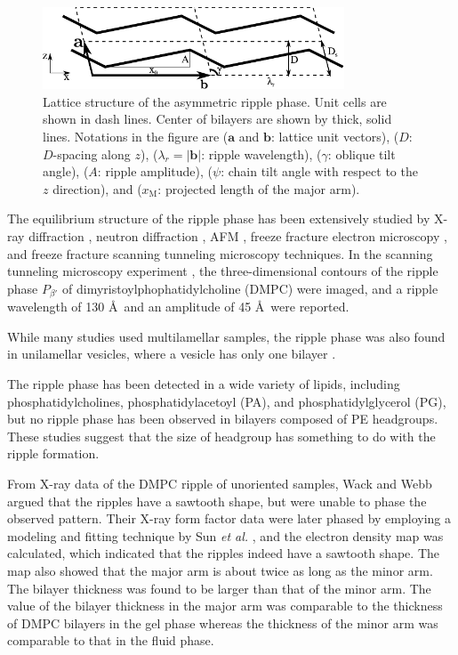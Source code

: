 \begin{figure}[htbp]
  \centering
  \includegraphics[width=0.8\textwidth]{figures/ripple/unit_cell}
  \caption{Lattice structure of the asymmetric ripple phase. Unit cells are shown in
  dash lines. Center of bilayers are shown by thick, solid lines. Notations 
  in the figure are ($\mathbf{a}$ and $\mathbf{b}$: lattice unit vectors),
  ($D$: $D$-spacing along $z$), ($\lambda_r=|\mathbf{b}|$: ripple wavelength), 
  ($\gamma$: oblique tilt angle), ($A$: ripple amplitude),
  ($\psi$: chain tilt angle with respect to the $z$ direction),
  and ($x_\textrm{M}$: projected length of the major arm).}
  \label{fig:unit_cell}
\end{figure}

The equilibrium structure of the ripple phase has been extensively studied by
X-ray diffraction \cite{ref:Janiak76,ref:Janiak79,ref:Tardieu73,ref:Wack89,ref:Yao91,ref:Sun96,ref:Cunningham98},
neutron diffraction \cite{ref:Mortensen88,ref:Bradshaw89}, 
AFM \cite{}, freeze fracture electron microscopy \cite{ref:Woodward96},
and freeze fracture scanning tunneling microscopy \cite{} techniques.
In the scanning tunneling microscopy experiment \cite{ref:Zasadzinski88}, 
the three-dimensional contours of the ripple phase $P_{\beta'}$ of
dimyristoylphophatidylcholine (DMPC) were imaged, and
a ripple wavelength of 130 \AA\ and an amplitude of 45 \AA\ were reported.

While many studies used multilamellar samples, the ripple phase was also found in
unilamellar vesicles, where a vesicle has only one bilayer 
\cite{ref:Mason99}.

The ripple phase has been detected in a wide variety of lipids, including
phosphatidylcholines, phosphatidylacetoyl (PA), and phosphatidylglycerol (PG),
but no ripple phase has been observed in bilayers composed of PE headgroups.
These studies suggest that the size of headgroup has something to do with
the ripple formation.

From X-ray data of the DMPC ripple of unoriented samples, 
Wack and Webb \cite{ref:Wack89} argued that the ripples have a sawtooth shape,
but were unable to phase the observed pattern.
Their X-ray form factor data were later
phased by employing a modeling and fitting technique by Sun \textit{et al.}
\cite{ref:Sun96}, and the electron density map was calculated, which indicated that  
the ripples indeed have a sawtooth shape. The map also showed that
the major arm is about twice as long as the minor arm. The bilayer
thickness was found to be larger than that of the minor arm. The
value of the bilayer thickness in the major arm was comparable to the
thickness of DMPC bilayers in the gel phase whereas the thickness
of the minor arm was comparable to that in the fluid phase.

